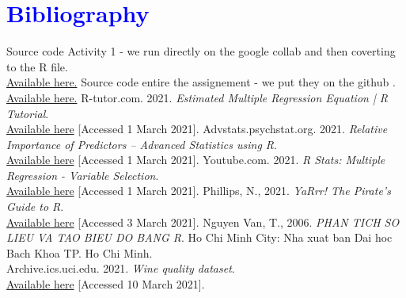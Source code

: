 \documentclass[a4paper]{article}
\begin{document}
\newpage
\section{\textcolor{blue}{Bibliography}}
\begin{thebibliography}{}
\bibitem{}
Source code Activity 1 - we run directly on the google collab and then coverting to the R file. \\
\href{https://colab.research.google.com/drive/1OGkY9_N7fz-LZsCLVjzNRSqwHHbHMw4C?usp=sharing}{Available here.} 
\bibitem{}
Source code entire the assignement - we put they on the github . \\
\href{https://github.com/huyle0107/Probability-Statistic_Assignment}{Available here.}  
\bibitem{}
R-tutor.com. 2021. \textit{Estimated Multiple Regression Equation | R Tutorial}. \\
\href{http://www.r-tutor.com/elementary-statistics/multiple-linear-regression/estimated-multiple-regression-equation}{Available here} [Accessed 1 March 2021].
\bibitem{}
Advstats.psychstat.org. 2021. \textit{Relative Importance of Predictors -- Advanced Statistics using R}. \\
\href{https://advstats.psychstat.org/book/mregression/importance.php}{Available here} [Accessed 1 March 2021].
\bibitem{}
Youtube.com. 2021. \textit{R Stats: Multiple Regression - Variable Selection}. \\
\href{https://www.youtube.com/watch?v=HP3RhjLhRjY&t=408s}{Available here} [Accessed 1 March 2021].
\bibitem{}
Phillips, N., 2021. \textit{YaRrr! The Pirate’s Guide to R}. \\
\href{https://www.researchgate.net/publication/315808637_YaRrr_The_pirate's_guide_to_R}{Available here} [Accessed 3 March 2021].
Nguyen Van, T., 2006. \textit{PHAN TICH SO LIEU VA TAO BIEU DO BANG R}. Ho Chi
Minh City: Nha xuat ban Dai hoc Bach Khoa TP. Ho Chi Minh. \\
\bibitem{}
Archive.ics.uci.edu. 2021. \textit{Wine quality dataset}. \\
\href{https://archive.ics.uci.edu/ml/datasets/Wine+Quality?fbclid=IwAR22sb8xl}{Available here} [Accessed 10 March 2021].

\end{thebibliography}
\end{document}
